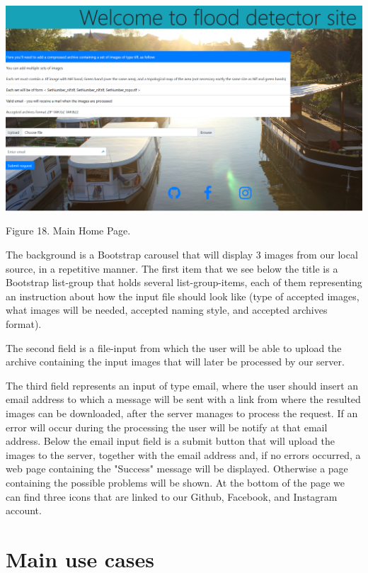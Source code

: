 \documentclass[12pt, a4paper]{report}
\begin{document}
\bigskip
\includegraphics[scale=0.4, center]{gui_homepage.png}
\begin{center}
Figure 18. Main Home Page. 
\end{center}
\par 

The background is a Bootstrap carousel that will display 3 images from our local source, in a repetitive manner. The first item that we see below the title is a Bootstrap list-group that holds several list-group-items, each of them representing an instruction about how the input file should look like (type of accepted images, what images will be needed, accepted naming style, and accepted archives format).
\par 

The second field is a file-input from which the user will be able to upload the archive containing the input images that will later be processed by our server.
\par 

The third field represents an input of type email, where the user should insert an email address to which a message will be sent with a link from where the resulted images can be downloaded, after the server manages to process the request. If an error will occur during the processing the user will be notify at that email address. Below the email input field is a submit button that will upload the images to the server, together with the email address and, if no errors occurred, a web page containing the "Success" message will be displayed. Otherwise a page containing the possible problems will be shown. At the bottom of the page we can find three icons that are linked to our Github, Facebook, and Instagram account.



\section{Main use cases}
\end{document}
